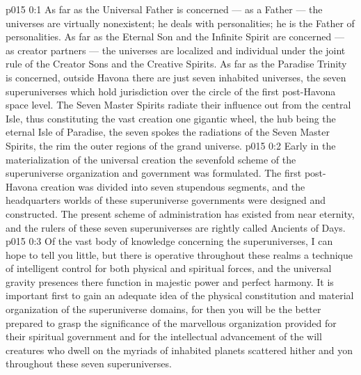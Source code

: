 \author{Universal Censor}
\vs p015 0:1 As far as the Universal Father is concerned --- as a Father --- the universes are virtually nonexistent; he deals with personalities; he is the Father of personalities. As far as the Eternal Son and the Infinite Spirit are concerned --- as creator partners --- the universes are localized and individual under the joint rule of the Creator Sons and the Creative Spirits. As far as the Paradise Trinity is concerned, outside Havona there are just seven inhabited universes, the seven superuniverses which hold jurisdiction over the circle of the first post\hyp{}Havona space level. The Seven Master Spirits radiate their influence out from the central Isle, thus constituting the vast creation one gigantic wheel, the hub being the eternal Isle of Paradise, the seven spokes the radiations of the Seven Master Spirits, the rim the outer regions of the grand universe.
\vs p015 0:2 Early in the materialization of the universal creation the sevenfold scheme of the superuniverse organization and government was formulated. The first post\hyp{}Havona creation was divided into seven stupendous segments, and the headquarters worlds of these superuniverse governments were designed and constructed. The present scheme of administration has existed from near eternity, and the rulers of these seven superuniverses are rightly called Ancients of Days.
\vs p015 0:3 Of the vast body of knowledge concerning the superuniverses, I can hope to tell you little, but there is operative throughout these realms a technique of intelligent control for both physical and spiritual forces, and the universal gravity presences there function in majestic power and perfect harmony. It is important first to gain an adequate idea of the physical constitution and material organization of the superuniverse domains, for then you will be the better prepared to grasp the significance of the marvellous organization provided for their spiritual government and for the intellectual advancement of the will creatures who dwell on the myriads of inhabited planets scattered hither and yon throughout these seven superuniverses.
